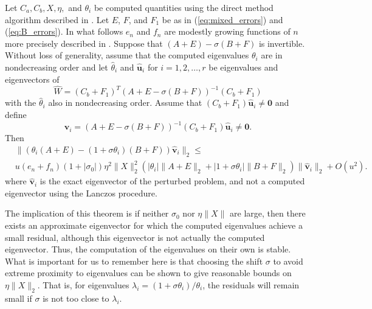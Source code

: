 \begin{theorem}
\label{thrm:ResidualBoundsEigenvalues}
	Let $C_a, C_b, X, \eta,$ and $\theta_i$ be computed quantities using the direct method algorithm described in \cite{stewart2024spectraltransformationdensesymmetric}. Let $E$, $F$, and $F_1$ be as in (\ref{eq:mixed_errors}) and (\ref{eq:B_errors}).  In what follows $e_n$ and $f_n$ are modestly growing functions of $n$ more precisely described in \cite{stewart2024spectraltransformationdensesymmetric}. Suppose that $(A + E) - \sigma(B + F)$ is invertible. Without loss of generality, assume that the computed eigenvalues $\theta_i$ are in nondecreasing order and let $\hat{\theta}_i$ and $\hat{\mathbf{u}}_i$ for $i = 1, 2, \dots, r$ be eigenvalues and eigenvectors of
	\[
	\hat{W} = (C_b + F_1)^{T} (A + E - \sigma(B + F))^{-1}(C_b + F_1)
	\]
	with the $\hat{\theta}_i$ also in nondecreasing order. Assume that $(C_b + F_1) \hat{\mathbf{u}}_i \neq \mathbf{0}$ and define
	\[
	\hat{\mathbf{v}}_i = (A + E - \sigma(B + F))^{-1} (C_b + F_1) \hat{\mathbf{u}}_i \neq \mathbf{0}.
	\]
	 Then
	\begin{align*}
		&\|(\theta_i (A + E) - (1 + \sigma \theta_i) (B + F)) \hat{\mathbf{v}}_i \|_2
		\leq \\
		& u (e_n + f_n)(1 + | \sigma_0 |) \eta^2 \| X \|_2^2 \left( | \theta_i | \| A + E \|_2 + | 1 + \sigma \theta_i | \| B + F \|_2 \right) \| \hat{\mathbf{v}}_i \|_2 + O(u^2).
	\end{align*}
        where $\hat{\mathbf{v}}_i$ is the exact eigenvector of the perturbed problem, and not a computed eigenvector using the Lanczos procedure.
\end{theorem}

The implication of this theorem is if neither $\sigma_0$ nor $\eta \|X\|$ are large, then there exists an approximate eigenvector for which the computed eigenvalues achieve a small residual, although this eigenvector is not actually the computed eigenvector.  Thus, the computation of the eigenvalues on their own is stable. What is important for us to remember here is that choosing the shift $\sigma$ to avoid extreme proximity to eigenvalues can be shown to give reasonable bounds on $\eta \|X\|_2$. That is, for eigenvalues $\lambda_i = (1 + \sigma \theta_i)/ \theta_i$, the residuals will remain small if $\sigma$ is not too close to $\lambda_i$.

